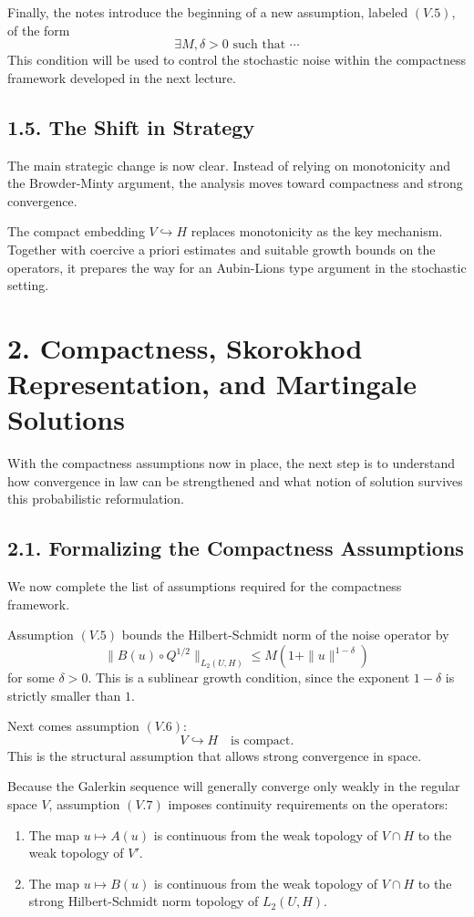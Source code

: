 \documentclass[11pt]{article}
\theoremstyle{definition}
\theoremstyle{remark}
\begin{document}
Finally, the notes introduce the beginning of a new assumption, labeled \((V.5)\), of the form
\[
\exists M,\delta>0 \text{ such that }\cdots
\]
This condition will be used to control the stochastic noise within the compactness framework developed in the next lecture.

\subsection*{1.5. The Shift in Strategy}
The main strategic change is now clear. Instead of relying on monotonicity and the Browder-Minty argument, the analysis moves toward compactness and strong convergence.

The compact embedding \(V\hookrightarrow H\) replaces monotonicity as the key mechanism. Together with coercive a priori estimates and suitable growth bounds on the operators, it prepares the way for an Aubin-Lions type argument in the stochastic setting.

\section*{2. Compactness, Skorokhod Representation, and Martingale Solutions}
With the compactness assumptions now in place, the next step is to understand how convergence in law can be strengthened and what notion of solution survives this probabilistic reformulation.

\subsection*{2.1. Formalizing the Compactness Assumptions}
We now complete the list of assumptions required for the compactness framework.

Assumption \((V.5)\) bounds the Hilbert-Schmidt norm of the noise operator by
\[
\|B(u)\circ Q^{1/2}\|_{L_2(U,H)}
\le
M(1+\|u\|^{1-\delta})
\]
for some \(\delta>0\). This is a sublinear growth condition, since the exponent \(1-\delta\) is strictly smaller than \(1\).

Next comes assumption \((V.6)\):
\[
V\hookrightarrow H \quad \text{is compact}.
\]
This is the structural assumption that allows strong convergence in space.

Because the Galerkin sequence will generally converge only weakly in the regular space \(V\), assumption \((V.7)\) imposes continuity requirements on the operators:
\begin{enumerate}
\item The map \(u\mapsto A(u)\) is continuous from the weak topology of \(V\cap H\) to the weak topology of \(V'\).
\item The map \(u\mapsto B(u)\) is continuous from the weak topology of \(V\cap H\) to the strong Hilbert-Schmidt norm topology of \(L_2(U,H)\).
\end{enumerate}
\end{document}
